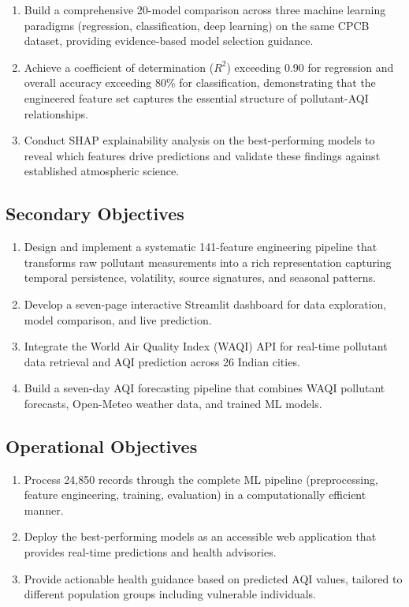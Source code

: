 \documentclass[12pt,a4paper]{report}
\begin{document}
\begin{enumerate}
    \item Build a comprehensive 20-model comparison across three machine learning paradigms (regression, classification, deep learning) on the same CPCB dataset, providing evidence-based model selection guidance.
    \item Achieve a coefficient of determination ($R^2$) exceeding 0.90 for regression and overall accuracy exceeding 80\% for classification, demonstrating that the engineered feature set captures the essential structure of pollutant-AQI relationships.
    \item Conduct SHAP explainability analysis on the best-performing models to reveal which features drive predictions and validate these findings against established atmospheric science.
\end{enumerate}

\subsection{Secondary Objectives}

\begin{enumerate}
    \item Design and implement a systematic 141-feature engineering pipeline that transforms raw pollutant measurements into a rich representation capturing temporal persistence, volatility, source signatures, and seasonal patterns.
    \item Develop a seven-page interactive Streamlit dashboard for data exploration, model comparison, and live prediction.
    \item Integrate the World Air Quality Index (WAQI) API for real-time pollutant data retrieval and AQI prediction across 26 Indian cities.
    \item Build a seven-day AQI forecasting pipeline that combines WAQI pollutant forecasts, Open-Meteo weather data, and trained ML models.
\end{enumerate}

\subsection{Operational Objectives}

\begin{enumerate}
    \item Process 24,850 records through the complete ML pipeline (preprocessing, feature engineering, training, evaluation) in a computationally efficient manner.
    \item Deploy the best-performing models as an accessible web application that provides real-time predictions and health advisories.
    \item Provide actionable health guidance based on predicted AQI values, tailored to different population groups including vulnerable individuals.
\end{enumerate}
\end{document}
